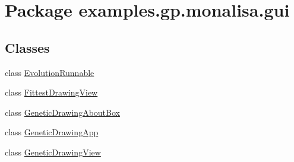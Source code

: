 \hypertarget{namespaceexamples_1_1gp_1_1monalisa_1_1gui}{\section{Package examples.\-gp.\-monalisa.\-gui}
\label{namespaceexamples_1_1gp_1_1monalisa_1_1gui}
}
\subsection*{Classes}
\begin{DoxyCompactItemize}
\item 
class \hyperlink{classexamples_1_1gp_1_1monalisa_1_1gui_1_1_evolution_runnable}{Evolution\-Runnable}
\item 
class \hyperlink{classexamples_1_1gp_1_1monalisa_1_1gui_1_1_fittest_drawing_view}{Fittest\-Drawing\-View}
\item 
class \hyperlink{classexamples_1_1gp_1_1monalisa_1_1gui_1_1_genetic_drawing_about_box}{Genetic\-Drawing\-About\-Box}
\item 
class \hyperlink{classexamples_1_1gp_1_1monalisa_1_1gui_1_1_genetic_drawing_app}{Genetic\-Drawing\-App}
\item 
class \hyperlink{classexamples_1_1gp_1_1monalisa_1_1gui_1_1_genetic_drawing_view}{Genetic\-Drawing\-View}
\end{DoxyCompactItemize}
